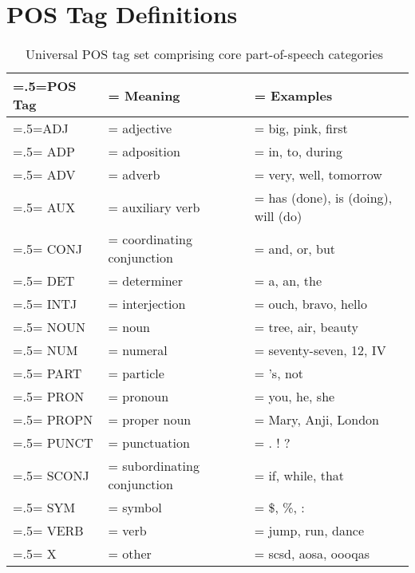 \listoffigures
\listoftables
\chapter{POS Tag Definitions}

\begin{table}[H]
    \centering
    \renewcommand{\arraystretch}{1.25}
    \begin{tabularx}{\textwidth}{|>{\hsize=.5\hsize\linewidth=\hsize}X|>{\hsize=1.0\hsize\linewidth=\hsize}X|>{\hsize=1.5\hsize\linewidth=\hsize}X|} 
     \hline
      \textbf{POS Tag} & \textbf{Meaning} & \textbf{Examples} \\
     \hline
        ADJ & adjective & big, pink, first  \\
        \hline
        ADP & adposition & in, to, during \\
        \hline
        ADV & adverb & very, well, tomorrow \\
        \hline
        AUX & auxiliary verb & has (done), is (doing), will (do) \\
        \hline
        CONJ & coordinating conjunction & and, or, but \\
        \hline
        DET & determiner &  a, an, the \\
        \hline
        INTJ & interjection &  ouch, bravo, hello \\
        \hline
        NOUN & noun & tree, air, beauty \\
        \hline
        NUM & numeral &  seventy-seven, 12, IV \\
        \hline
        PART & particle & 's, not \\
        \hline
        PRON & pronoun & you, he, she \\
        \hline
        PROPN & proper noun & Mary, Anji, London \\
        \hline
        PUNCT & punctuation & . ! ? \\
        \hline
        SCONJ & subordinating conjunction & if, while, that \\
        \hline
        SYM & symbol & \$, \%, : \\
        \hline
        VERB & verb & jump, run, dance \\
        \hline
        X & other & scsd, aosa, oooqas \\
    \hline
    \end{tabularx}
    \caption{Universal POS tag set comprising core part-of-speech categories~\cite{universal_pos_tags}}
    \label{appendix:pos}
    \end{table}
    
